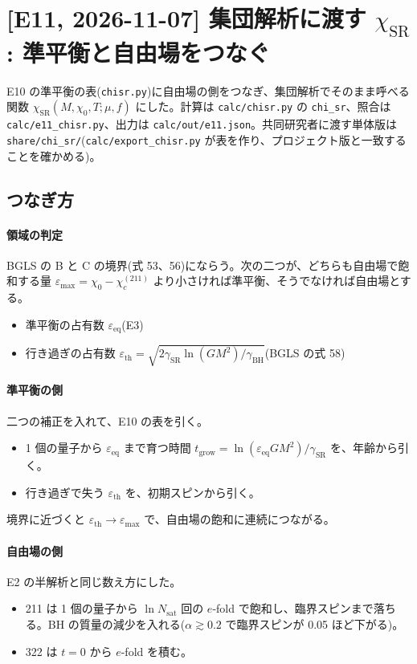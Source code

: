 \section{[E11, 2026-11-07] 集団解析に渡す $\chi_\mathrm{SR}$: 準平衡と自由場をつなぐ}\label{sec:e11}

E10 の準平衡の表(\texttt{chisr.py})に自由場の側をつなぎ、集団解析でそのまま呼べる関数 $\chi_\mathrm{SR}(M,\chi_0,T;\mu,f)$ にした。計算は \texttt{calc/chisr.py} の \texttt{chi\_sr}、照合は \texttt{calc/e11\_chisr.py}、出力は \texttt{calc/out/e11.json}。共同研究者に渡す単体版は \texttt{share/chi\_sr/}(\texttt{calc/export\_chisr.py} が表を作り、プロジェクト版と一致することを確かめる)。

\subsection{つなぎ方}

\paragraph{領域の判定}
BGLS の B と C の境界(式 53、56)にならう。次の二つが、どちらも自由場で飽和する量 $\varepsilon_\mathrm{max}=\chi_0-\chi_c^{(211)}$ より小さければ準平衡、そうでなければ自由場とする。
\begin{itemize}
\item 準平衡の占有数 $\varepsilon_\mathrm{eq}$(E3)
\item 行き過ぎの占有数 $\varepsilon_\mathrm{th}=\sqrt{2\gamma_\mathrm{SR}\ln(GM^2)/\gamma_\mathrm{BH}}$(BGLS の式 58)
\end{itemize}

\paragraph{準平衡の側}
二つの補正を入れて、E10 の表を引く。
\begin{itemize}
\item 1 個の量子から $\varepsilon_\mathrm{eq}$ まで育つ時間 $t_\mathrm{grow}=\ln(\varepsilon_\mathrm{eq}GM^2)/\gamma_\mathrm{SR}$ を、年齢から引く。
\item 行き過ぎで失う $\varepsilon_\mathrm{th}$ を、初期スピンから引く。
\end{itemize}
境界に近づくと $\varepsilon_\mathrm{th}\to\varepsilon_\mathrm{max}$ で、自由場の飽和に連続につながる。

\paragraph{自由場の側}
E2 の半解析と同じ数え方にした。
\begin{itemize}
\item 211 は 1 個の量子から $\ln N_\mathrm{sat}$ 回の $e$-fold で飽和し、臨界スピンまで落ちる。BH の質量の減少を入れる($\alpha\gtrsim0.2$ で臨界スピンが 0.05 ほど下がる)。
\item 322 は $t=0$ から $e$-fold を積む。
\end{itemize}

